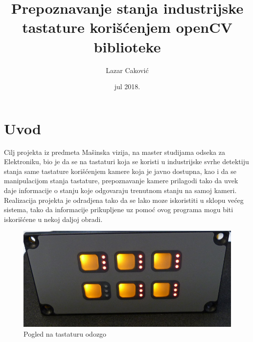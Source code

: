 \documentclass[a4paper,12pt, projekat]{etf}
\title{Prepoznavanje stanja industrijske tastature kori\v{s}\'{c}enjem openCV
biblioteke}
\author{Lazar Caković}
\date{jul 2018.}
\begin{document}
	\maketitle

	\tableofcontents

	\listoffigures

	\newpage

	\chapter{Uvod}
        Cilj projekta iz predmeta Ma\v{s}inska vizija, na master studijama odseka
        za Elektroniku, bio je da se na tastaturi koja se koristi u industrijske
        svrhe detektiju stanja same tastature kori\v{s}\'{c}enjem kamere koja je javno
        dostupna, kao i da se manipulacijom stanja tastature, prepoznavanje
        kamere prilagodi tako da uvek daje informacije o stanju koje odgovaraju
        trenutnom stanju na samoj kameri. Realizacija projekta je odradjena tako
        da se lako moze iskoristiti u sklopu ve\'{c}eg sistema, tako da informacije
        prikupljene uz pomo\'{c} ovog programa mogu biti iskori\v{s}\'{c}ene u nekoj daljoj
        obradi.

        \begin{figure}[htb]
            \centering
            \includegraphics[scale=.5]{front.jpg}
            \caption{Pogled na tastaturu odozgo}
            \label{fig:keyboard}
        \end{figure}
\end{document}
